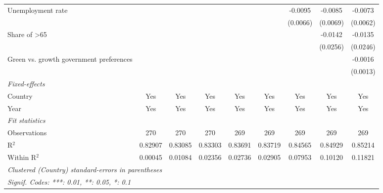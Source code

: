 \begin{table}[htbp]
\begin{tabular}{lcccccccc}
      Unemployment rate                       &          &          &              &               &              & -0.0095       & -0.0085       & -0.0073\\   
                                              &          &          &              &               &              & (0.0066)      & (0.0069)      & (0.0062)\\   
      Share of >65                            &          &          &              &               &              &               & -0.0142       & -0.0135\\   
                                              &          &          &              &               &              &               & (0.0256)      & (0.0246)\\   
      Green vs. growth government preferences &          &          &              &               &              &               &               & -0.0016\\   
                                              &          &          &              &               &              &               &               & (0.0013)\\   
      \midrule
      \emph{Fixed-effects}\\
      Country                                 & Yes      & Yes      & Yes          & Yes           & Yes          & Yes           & Yes           & Yes\\  
      Year                                    & Yes      & Yes      & Yes          & Yes           & Yes          & Yes           & Yes           & Yes\\  
      \midrule
      \emph{Fit statistics}\\
      Observations                            & 270      & 270      & 270          & 269           & 269          & 269           & 269           & 269\\  
      R$^2$                                   & 0.82907  & 0.83085  & 0.83303      & 0.83691       & 0.83719      & 0.84565       & 0.84929       & 0.85214\\  
      Within R$^2$                            & 0.00045  & 0.01084  & 0.02356      & 0.02736       & 0.02905      & 0.07953       & 0.10120       & 0.11821\\  
      \midrule \midrule
      \multicolumn{9}{l}{\emph{Clustered (Country) standard-errors in parentheses}}\\
      \multicolumn{9}{l}{\emph{Signif. Codes: ***: 0.01, **: 0.05, *: 0.1}}\\
   \end{tabular}
\end{table}



